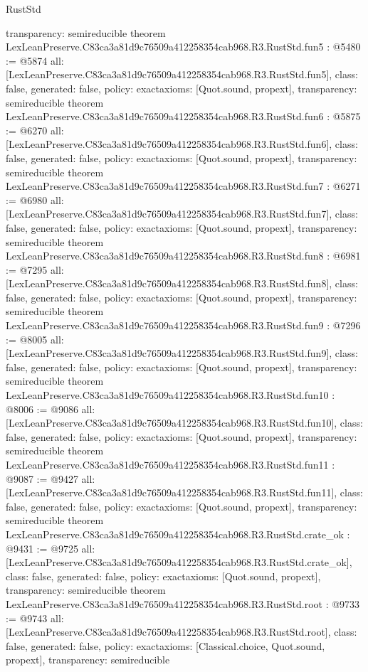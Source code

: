\begin{lexlean}{RustStd}
\begin{coremodule}
{  transparency: semireducible
}
theorem LexLeanPreserve.C83ca3a81d9c76509a412258354cab968.R3.RustStd.fun5 : @5480 := @5874 {
  all: [LexLeanPreserve.C83ca3a81d9c76509a412258354cab968.R3.RustStd.fun5],
  class: false,
  generated: false,
  policy: exact{axioms: [Quot.sound, propext]},
  transparency: semireducible
}
theorem LexLeanPreserve.C83ca3a81d9c76509a412258354cab968.R3.RustStd.fun6 : @5875 := @6270 {
  all: [LexLeanPreserve.C83ca3a81d9c76509a412258354cab968.R3.RustStd.fun6],
  class: false,
  generated: false,
  policy: exact{axioms: [Quot.sound, propext]},
  transparency: semireducible
}
theorem LexLeanPreserve.C83ca3a81d9c76509a412258354cab968.R3.RustStd.fun7 : @6271 := @6980 {
  all: [LexLeanPreserve.C83ca3a81d9c76509a412258354cab968.R3.RustStd.fun7],
  class: false,
  generated: false,
  policy: exact{axioms: [Quot.sound, propext]},
  transparency: semireducible
}
theorem LexLeanPreserve.C83ca3a81d9c76509a412258354cab968.R3.RustStd.fun8 : @6981 := @7295 {
  all: [LexLeanPreserve.C83ca3a81d9c76509a412258354cab968.R3.RustStd.fun8],
  class: false,
  generated: false,
  policy: exact{axioms: [Quot.sound, propext]},
  transparency: semireducible
}
theorem LexLeanPreserve.C83ca3a81d9c76509a412258354cab968.R3.RustStd.fun9 : @7296 := @8005 {
  all: [LexLeanPreserve.C83ca3a81d9c76509a412258354cab968.R3.RustStd.fun9],
  class: false,
  generated: false,
  policy: exact{axioms: [Quot.sound, propext]},
  transparency: semireducible
}
theorem LexLeanPreserve.C83ca3a81d9c76509a412258354cab968.R3.RustStd.fun10 : @8006 := @9086 {
  all: [LexLeanPreserve.C83ca3a81d9c76509a412258354cab968.R3.RustStd.fun10],
  class: false,
  generated: false,
  policy: exact{axioms: [Quot.sound, propext]},
  transparency: semireducible
}
theorem LexLeanPreserve.C83ca3a81d9c76509a412258354cab968.R3.RustStd.fun11 : @9087 := @9427 {
  all: [LexLeanPreserve.C83ca3a81d9c76509a412258354cab968.R3.RustStd.fun11],
  class: false,
  generated: false,
  policy: exact{axioms: [Quot.sound, propext]},
  transparency: semireducible
}
theorem LexLeanPreserve.C83ca3a81d9c76509a412258354cab968.R3.RustStd.crate_ok : @9431 := @9725 {
  all: [LexLeanPreserve.C83ca3a81d9c76509a412258354cab968.R3.RustStd.crate_ok],
  class: false,
  generated: false,
  policy: exact{axioms: [Quot.sound, propext]},
  transparency: semireducible
}
theorem LexLeanPreserve.C83ca3a81d9c76509a412258354cab968.R3.RustStd.root : @9733 := @9743 {
  all: [LexLeanPreserve.C83ca3a81d9c76509a412258354cab968.R3.RustStd.root],
  class: false,
  generated: false,
  policy: exact{axioms: [Classical.choice, Quot.sound, propext]},
  transparency: semireducible
}


\end{coremodule}
\end{lexlean}
